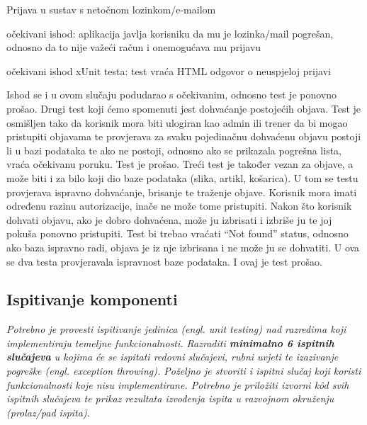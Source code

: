 		 	\begin{packed_item}
		 	
		 	\item Prijava u sustav s netočnom lozinkom/e-mailom
		 	\item[] \begin{packed_enum}
		 		\item očekivani ishod: aplikacija javlja korisniku da mu je lozinka/mail pogrešan, odnosno da to nije važeći račun i onemogućava mu prijavu
		 		\item očekivani ishod xUnit testa: test vraća HTML odgovor o neuspjeloj prijavi
		 		
		 	\end{packed_enum}
		 \end{packed_item}
		 \textnormal {Ishod se i u ovom slučaju podudarao s očekivanim, odnosno test je ponovno prošao.}
		 \bigbreak
		 \textnormal {Drugi test koji ćemo spomenuti jest dohvaćanje postojećih objava. Test je osmišljen tako da korisnik mora biti ulogiran kao admin ili trener da bi mogao pristupiti objavama te provjerava za svaku pojedinačnu dohvaćenu objavu postoji li u bazi podataka te ako ne postoji, odnosno ako se prikazala pogrešna lista, vraća očekivanu poruku. Test je prošao.}
		 \bigbreak
		 \textnormal{Treći test je također vezan za objave, a može biti i za bilo koji dio baze podataka (slika, artikl, košarica). U tom se testu provjerava ispravno dohvaćanje, brisanje te traženje objave. Korisnik mora imati određenu razinu autorizacije, inače ne može tome pristupiti. Nakon što korisnik dohvati objavu, ako je dobro dohvaćena, može ju izbrisati i izbriše ju te joj pokuša ponovno pristupiti. Test bi trebao vraćati “Not found” status, odnosno ako baza ispravno radi, objava je iz nje izbrisana i ne može ju se dohvatiti. U ova se dva testa provjeravala ispravnost baze podataka. I ovaj je test prošao.
		 }
	
			
			\subsection{Ispitivanje komponenti}
			\textit{Potrebno je provesti ispitivanje jedinica (engl. unit testing) nad razredima koji implementiraju temeljne funkcionalnosti. Razraditi \textbf{minimalno 6 ispitnih slučajeva} u kojima će se ispitati redovni slučajevi, rubni uvjeti te izazivanje pogreške (engl. exception throwing). Poželjno je stvoriti i ispitni slučaj koji koristi funkcionalnosti koje nisu implementirane. Potrebno je priložiti izvorni kôd svih ispitnih slučajeva te prikaz rezultata izvođenja ispita u razvojnom okruženju (prolaz/pad ispita). }
			
